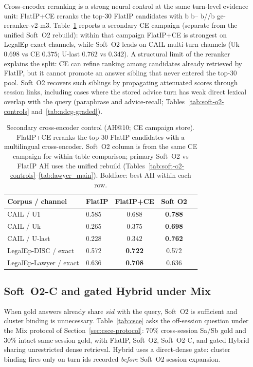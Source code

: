 \documentclass[preprint,12pt,authoryear]{elsarticle}
\DeclareRobustCommand{\modelid}[1]{{\ttfamily\modelidbreak#1\relax}}
\def\modelidbreak#1{%
  \ifx#1\relax\else
    \ifx#1--\hspace{0pt}\else
    \ifx#1//\hspace{0pt}\else#1\fi\fi
    \expandafter\modelidbreak
  \fi}
\newcommand{\compacttab}{\setlength{\tabcolsep}{4.5pt}\renewcommand{\arraystretch}{1.05}}
\begin{document}
Cross-encoder reranking is a strong neural control at the same turn-level evidence unit: FlatIP+CE reranks the top-$30$ FlatIP candidates with \modelid{bge-reranker-v2-m3}.
Table~\ref{tab:ce} reports a secondary CE campaign (separate from the unified Soft~O2 rebuild): within that campaign FlatIP+CE is strongest on LegalEp exact channels, while Soft~O2 leads on CAIL multi-turn channels (Uk $0.698$ vs CE $0.375$; U-last $0.762$ vs $0.342$).
A structural limit of the reranker explains the split: CE can refine ranking among candidates already retrieved by FlatIP, but it cannot promote an answer sibling that never entered the top-$30$ pool.
Soft~O2 recovers such siblings by propagating attenuated scores through session links, including cases where the stored advice turn has weak direct lexical overlap with the query (paraphrase and advice-recall; Tables~\ref{tab:soft-o2-controls} and~\ref{tab:ndcg-graded}).

\begin{table}[t]
\centering
\caption{Secondary cross-encoder control (AH@10; CE campaign store). FlatIP+CE reranks the top-$30$ FlatIP candidates with a multilingual cross-encoder. Soft~O2 column is from the same CE campaign for within-table comparison; primary Soft~O2 vs FlatIP AH uses the unified rebuild (Tables~\ref{tab:soft-o2-controls}--\ref{tab:lawyer_main}). Boldface: best AH within each row.}
\label{tab:ce}
\compacttab\footnotesize
\begin{tabular}{@{}llccc@{}}
\toprule
\textbf{Corpus / channel} & \textbf{FlatIP} & \textbf{FlatIP+CE} & \textbf{Soft O2} \\
\midrule
CAIL / U1 & 0.585 & 0.688 & \textbf{0.788} \\
CAIL / Uk & 0.265 & 0.375 & \textbf{0.698} \\
CAIL / U-last & 0.228 & 0.342 & \textbf{0.762} \\
LegalEp-DISC / exact & 0.572 & \textbf{0.722} & 0.572 \\
LegalEp-Lawyer / exact & 0.636 & \textbf{0.708} & 0.636 \\
\bottomrule
\end{tabular}
\end{table}

\subsection{Soft~O2-C and gated Hybrid under Mix}\label{sec:exp-cluster}
When gold answers already share $sid$ with the query, Soft~O2 is sufficient and cluster binding is unnecessary.
Table~\ref{tab:csce} asks the off-session question under the Mix protocol of Section~\ref{sec:csce-protocol}: $70\%$ cross-session Sa/Sb gold and $30\%$ intact same-session gold, with FlatIP, Soft~O2, Soft~O2-C, and gated Hybrid sharing unrestricted dense retrieval.
Hybrid uses a direct-dense gate: cluster binding fires only on turn ids recorded \emph{before} Soft~O2 session expansion.
\end{document}
